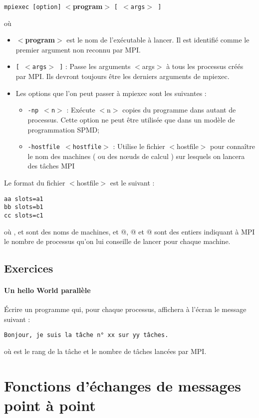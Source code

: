 \documentclass[11pt,a4paper]{article}
\begin{document}
\texttt{mpiexec [option]} \textbf{$<$program$>$} \texttt{[ $<$args$>$ ]}

où
\begin{itemize}
\item \textbf{$<$program$>$} est le nom de l'exécutable à lancer. Il est identifié comme le premier argument non reconnu par MPI.
\item \texttt{[ $<$args$>$ ]} : Passe les arguments $<$args$>$  à tous les processus créés par MPI. Ils devront toujours être les derniers arguments de mpiexec. 
\item Les options que l'on peut passer à mpiexec sont les suivantes :
\begin{itemize}
\item \texttt{-np $<$n$>$} : Exécute $<$n$>$ copies du programme dans autant de processus. Cette option ne peut être
utilisée que dans un modèle de programmation SPMD;
\item \texttt{-hostfile $<$hostfile$>$} : Utilise le fichier $<$hostfile$>$ pour connaître le nom des machines
( ou des n{\oe}uds de calcul ) sur lesquels on lancera des tâches MPI
\end{itemize}
\end{itemize}

Le format du fichier $<$hostfile$>$ est le suivant :
\begin{verbatim}
aa slots=a1
bb slots=b1
cc slots=c1
\end{verbatim}
où \verb@aa@, \verb@bb@ et \verb@cc@ sont des noms de machines, et @, @ et @ sont des entiers indiquant à MPI le nombre de processus qu'on lui conseille de lancer pour chaque machine.

\subsection{Exercices}

\paragraph{Un hello World parallèle}

\'Ecrire un programme qui, pour chaque processus, affichera à l'écran le message suivant :
\begin{verbatim}
Bonjour, je suis la tâche n° xx sur yy tâches.
\end{verbatim}
où \verb@xx@ est le rang de la tâche et \verb@yy@ le nombre de tâches lancées par MPI.

\section{Fonctions d'échanges de messages point à point}
\end{document}
